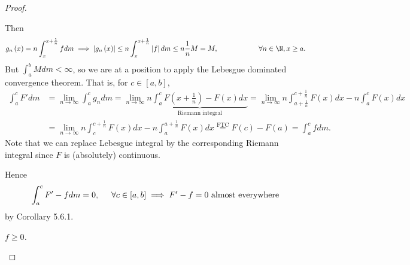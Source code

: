 \documentclass[pmath451]{subfiles}
\begin{document}
\begin{proof}
\begin{case}
            Then
            \begin{equation*}
                g_n\left( x \right) = n\int^{x+\frac{1}{n}}_{x}fdm \implies \left| g_n\left( x \right) \right| \leq n \int^{x+\frac{1}{n}}_{x}\left| f \right|dm \leq n \frac{1}{n}M = M, \hspace{2cm}\forall n\in\N,x\geq a.
            \end{equation*}
            But $\int^b_a M dm < \infty$, so we are at a position to apply the Lebesgue dominated convergence theorem. That is, for $c\in \left[ a,b \right]$,
            \begin{equation*}
                \begin{aligned}
                    \int^{c}_{a}F'dm & = \lim_{n\to\infty}\int^{c}_{a}g_ndm = \lim_{n\to\infty} n\underbrace{\int^{c}_{a}F\left( x+\frac{1}{n} \right)-F\left( x \right)dx}_{\text{Riemann integral}} = \lim_{n\to\infty} n \int^{c+\frac{1}{n}}_{a+\frac{1}{n}} F\left( x \right)dx - n \int^{c}_{a} F\left( x \right)dx \\
                                     & = \lim_{n\to\infty} n\int^{c+\frac{1}{n}}_{c}F\left( x \right)dx - n\int^{a+\frac{1}{n}}_{a}F\left( x \right)dx \overset{\text{FTC}}{=} F\left( c \right) - F\left( a \right) = \int^{c}_{a}fdm .
                \end{aligned} 
            \end{equation*}
            Note that we can replace Lebesgue integral by the corresponding Riemann integral since $F$ is (absolutely) continuous.

            Hence
            \begin{equation*}
                \int^{c}_{a}F'-fdm = 0, \hspace{0.5cm}\forall c\in \left[ a,b \right]\implies F'-f = 0 \text{ almost everywhere}
            \end{equation*}
            by Corollary 5.6.1.
        \end{case}

        \begin{case}
            \textit{$f\geq 0$.}


\end{case}
\end{proof}
\end{document}
